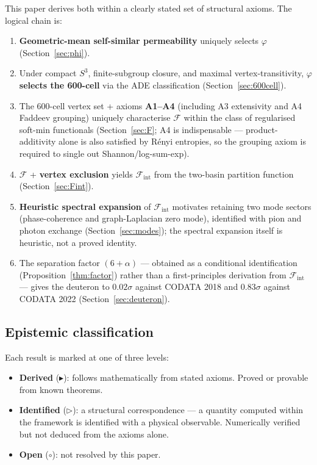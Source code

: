 \documentclass[12pt]{article}
\newcommand{\Fcal}{\mathcal{F}}
\newcommand{\Fint}{\Fcal_{\mathrm{int}}}
\newcommand{\phig}{\varphi}
\begin{document}
This paper derives both within a clearly stated set of structural
axioms. The logical chain is:
\begin{enumerate}
    \item \textbf{Geometric-mean self-similar permeability} uniquely selects $\phig$ (Section~\ref{sec:phi}).
    \item Under compact $S^3$, finite-subgroup closure, and maximal vertex-transitivity, $\phig$ \textbf{selects the 600-cell} via the ADE classification (Section~\ref{sec:600cell}).
    \item The 600-cell vertex set + axioms \textbf{A1--A4} (including A3 extensivity and A4 Faddeev grouping) uniquely characterise $\Fcal$ within the class of regularised soft-min functionals (Section~\ref{sec:F}; A4 is indispensable --- product-additivity alone is also satisfied by R\'enyi entropies, so the grouping axiom is required to single out Shannon/log-sum-exp).
    \item $\Fcal$ + \textbf{vertex exclusion} yields $\Fint$ from the two-basin partition function (Section~\ref{sec:Fint}).
    \item \textbf{Heuristic spectral expansion} of $\Fint$ motivates retaining two mode sectors (phase-coherence and graph-Laplacian zero mode), identified with pion and photon exchange (Section~\ref{sec:modes}); the spectral expansion itself is heuristic, not a proved identity.
    \item The separation factor $(6 + \alpha)$ --- obtained as a conditional identification (Proposition~\ref{thm:factor}) rather than a first-principles derivation from $\Fint$ --- gives the deuteron to $0.02\sigma$ against CODATA 2018 and $0.83\sigma$ against CODATA 2022 (Section~\ref{sec:deuteron}).
\end{enumerate}

\subsection*{Epistemic classification}

Each result is marked at one of three levels:
\begin{itemize}
    \item \textbf{Derived} ($\blacktriangleright$): follows mathematically from stated axioms. Proved or provable from known theorems.
    \item \textbf{Identified} ($\triangleright$): a structural correspondence --- a quantity computed within the framework is identified with a physical observable. Numerically verified but not deduced from the axioms alone.
    \item \textbf{Open} ($\circ$): not resolved by this paper.
\end{itemize}
\end{document}
